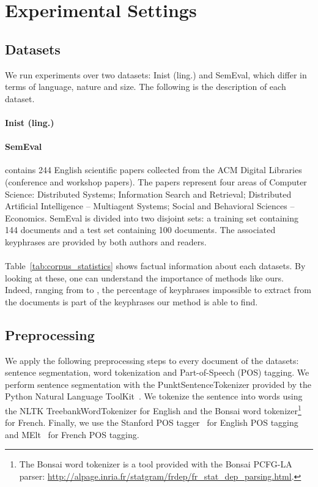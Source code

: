\section{Experimental Settings}
\label{sec:experimental_settings}
  \subsection{Datasets}
  \label{subsec:datasets}
    We run experiments over two datasets: Inist (ling.) and SemEval, which
    differ in terms of language, nature and size. The following is the
    description of each dataset.

    \paragraph{Inist (ling.)} 

    \paragraph{SemEval~\textnormal{\cite{kim2010semeval}}} contains 244 English
    scientific papers collected from the ACM Digital Libraries (conference and
    workshop papers). The papers represent four areas of Computer Science:
    Distributed Systems; Information Search and Retrieval; Distributed
    Artificial Intelligence -- Multiagent Systems; Social and Behavioral
    Sciences -- Economics. SemEval is divided into two disjoint sets: a training
    set containing 144 documents and a test set containing 100 documents. The
    associated keyphrases are provided by both authors and readers.

    \paragraph{}
    Table~\ref{tab:corpus_statistics} shows factual information about each
    datasets. By looking at these, one can understand the importance of methods
    like ours. Indeed, ranging from  to , the percentage
    of keyphrases impossible to extract from the documents is part of the
    keyphrases our method is able to find.

  \subsection{Preprocessing}
  \label{subsec:preprocessing}
    We apply the following preprocessing steps to every document of the
    datasets: sentence segmentation, word tokenization and Part-of-Speech (POS)
    tagging. We perform sentence segmentation with the PunktSentenceTokenizer
    provided by the Python Natural Language ToolKit~\cite[NLTK]{bird2009nltk}.
    We tokenize the sentence into words using the NLTK TreebankWordTokenizer for
    English and the Bonsai word tokenizer\footnote{The Bonsai word tokenizer is
    a tool provided with the Bonsai PCFG-LA parser:
    \url{http://alpage.inria.fr/statgram/frdep/fr_stat_dep_parsing.html}.} for
    French. Finally, we use the Stanford POS
    tagger~\cite{toutanova2003stanfordpostagger} for English POS tagging and
    MElt~\cite{denis2009melt} for French POS tagging.

